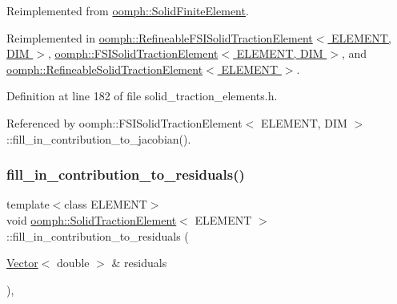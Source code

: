 Reimplemented from \hyperlink{classoomph_1_1SolidFiniteElement_a3167a2005e33815948bef357214e15ee}{oomph\+::\+Solid\+Finite\+Element}.



Reimplemented in \hyperlink{classoomph_1_1RefineableFSISolidTractionElement_a886a6bcb5722c9535f6f78ccefdc0646}{oomph\+::\+Refineable\+F\+S\+I\+Solid\+Traction\+Element$<$ E\+L\+E\+M\+E\+N\+T, D\+I\+M $>$}, \hyperlink{classoomph_1_1FSISolidTractionElement_a789bdb99ca30e3c7b56adab5be79a59d}{oomph\+::\+F\+S\+I\+Solid\+Traction\+Element$<$ E\+L\+E\+M\+E\+N\+T, D\+I\+M $>$}, and \hyperlink{classoomph_1_1RefineableSolidTractionElement_ad1921c9d88c2d71c0f3735259faaef35}{oomph\+::\+Refineable\+Solid\+Traction\+Element$<$ E\+L\+E\+M\+E\+N\+T $>$}.



Definition at line 182 of file solid\+\_\+traction\+\_\+elements.\+h.



Referenced by oomph\+::\+F\+S\+I\+Solid\+Traction\+Element$<$ E\+L\+E\+M\+E\+N\+T, D\+I\+M $>$\+::fill\+\_\+in\+\_\+contribution\+\_\+to\+\_\+jacobian().

\mbox{\label{classoomph_1_1SolidTractionElement_aaa22a21aa54edecac7052f6bcf0867a4}} 
\subsubsection{\texorpdfstring{fill\+\_\+in\+\_\+contribution\+\_\+to\+\_\+residuals()}{fill\_in\_contribution\_to\_residuals()}}
{\footnotesize\ttfamily template$<$class E\+L\+E\+M\+E\+NT$>$ \\
void \hyperlink{classoomph_1_1SolidTractionElement}{oomph\+::\+Solid\+Traction\+Element}$<$ E\+L\+E\+M\+E\+NT $>$\+::fill\+\_\+in\+\_\+contribution\+\_\+to\+\_\+residuals (\begin{DoxyParamCaption}\item[{\hyperlink{classoomph_1_1Vector}{Vector}$<$ double $>$ \&}]{residuals }\end{DoxyParamCaption})\hspace{0.3cm}{\ttfamily [inline]}, {\ttfamily [virtual]}}



